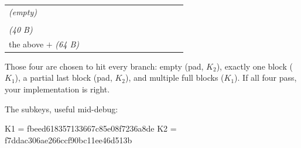 \begin{center}\small
\begin{tabular}{@{}L{0.44\linewidth}L{0.46\linewidth}@{}}
\toprule
{} &  \\
\midrule
\emph{(empty)} &  \\
 &  \\
\newline
{}\newline
{} \emph{(40 B)} &  \\
the above $+$ \newline
{} \emph{(64 B)} &  \\
\bottomrule
\end{tabular}
\end{center}

Those four are chosen to hit every branch: empty (pad, $K_2$), exactly one block
($K_1$), a partial last block (pad, $K_2$), and multiple full blocks ($K_1$). If
all four pass, your implementation is right.

The subkeys, useful mid-debug:

\begin{trace}
K1 = fbeed618357133667c85e08f7236a8de
K2 = f7ddac306ae266ccf90bc11ee46d513b
\end{trace}

